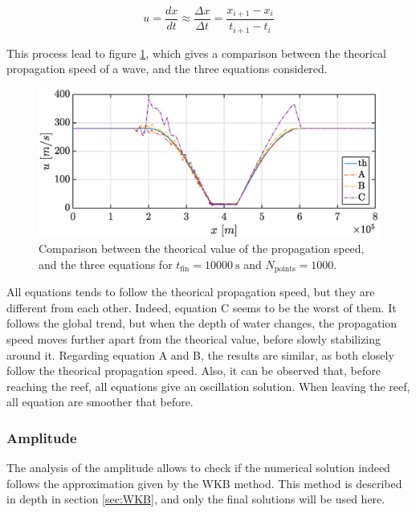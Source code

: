 \documentclass[a4paper,12pt,twoside]{article}
\begin{document}
        \begin{equation}
          u=\frac{dx}{dt}\approx\frac{\Delta x}{\Delta t}=\frac{x_{i+1} - x_i}{t_{i+1} - t_i}
          \label{eq:DFM-u}
        \end{equation}

        This process lead to figure \ref{fig:tsunami_speed}, which gives a comparison between the theorical propagation speed of a wave, and the three equations considered.

        \begin{figure}[h]
          \centering
          \includegraphics[width=\textwidth]{graphs/tsunami_speed.eps}
          \caption{Comparison between the theorical value of the propagation speed, and the three equations for $t_\text{fin} = \SI{10000}{\s}$ and $N_\text{points} = \num{1000}$.}
          \label{fig:tsunami_speed}
        \end{figure}

        All equations tends to follow the theorical propagation speed, but they are different from each other.
        Indeed, equation C seems to be the worst of them.
        It follows the global trend, but when the depth of water changes, the propagation speed moves further apart from the theorical value, before slowly stabilizing around it.
        Regarding equation A and B, the results are similar, as both closely follow the theorical propagation speed.
        Also, it can be observed that, before reaching the reef, all equations give an oscillation solution.
        When leaving the reef, all equation are smoother that before. %

      \subsubsection{Amplitude}
      The analysis of the amplitude allows to check if the numerical solution indeed follows the approximation given by the WKB method.
      This method is described in depth in section \ref{sec:WKB}, and only the final solutions will be used here.
\end{document}
